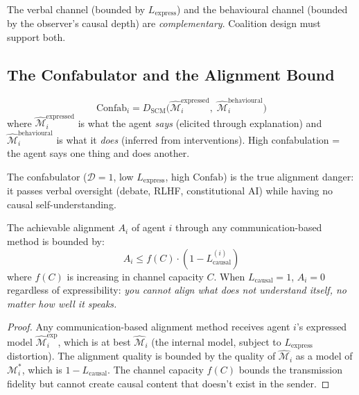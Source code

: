 The verbal channel (bounded by $L_{\text{express}}$) and the behavioural channel (bounded by the observer's causal depth) are \emph{complementary}. Coalition design must support both.


\subsection{The Confabulator and the Alignment Bound}

\begin{definition}
\label{def:confab-ch3}
\begin{equation}
    \text{Confab}_i = D_{\text{SCM}}\bigl(\hat{\mathcal{M}}_i^{\text{expressed}},\; \hat{\mathcal{M}}_i^{\text{behavioural}}\bigr)
\end{equation}
where $\hat{\mathcal{M}}_i^{\text{expressed}}$ is what the agent \emph{says} (elicited through explanation) and $\hat{\mathcal{M}}_i^{\text{behavioural}}$ is what it \emph{does} (inferred from interventions). High confabulation = the agent says one thing and does another.
\end{definition}

The confabulator ($\mathcal{D} = 1$, low $L_{\text{express}}$, high $\text{Confab}$) is the true alignment danger: it passes verbal oversight (debate, RLHF, constitutional AI) while having no causal self-understanding.

\begin{theorem}
\label{thm:alignment-bound-ch3}
The achievable alignment $A_i$ of agent $i$ through any communication-based method is bounded by:
\begin{equation}
    A_i \leq f(C) \cdot (1 - L_{\text{causal}}^{(i)})
\end{equation}
where $f(C)$ is increasing in channel capacity $C$. When $L_{\text{causal}} = 1$, $A_i = 0$ regardless of expressibility: \emph{you cannot align what does not understand itself, no matter how well it speaks.}
\end{theorem}

\begin{proof}
Any communication-based alignment method receives agent $i$'s expressed model $\hat{\mathcal{M}}_i^{\text{exp}}$, which is at best $\hat{\mathcal{M}}_i$ (the internal model, subject to $L_{\text{express}}$ distortion). The alignment quality is bounded by the quality of $\hat{\mathcal{M}}_i$ as a model of $\mathcal{M}_i^*$, which is $1 - L_{\text{causal}}$. The channel capacity $f(C)$ bounds the transmission fidelity but cannot create causal content that doesn't exist in the sender.
\end{proof}

